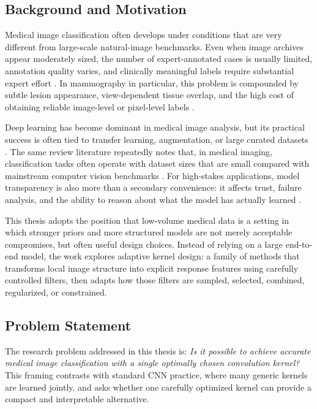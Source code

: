 \documentclass{cernatsnote}
\let\oldsubsection\subsection
\let\oldsubsubsection\subsubsection
\let\section\oldsubsection
\let\subsection\oldsubsubsection
\begin{document}
\section{Background and Motivation}
Medical image classification often develops under conditions that are very different from large-scale natural-image benchmarks. Even when image archives appear moderately sized, the number of expert-annotated cases is usually limited, annotation quality varies, and clinically meaningful labels require substantial expert effort \citep{litjens2017survey,gardezi2019mammographic,pachetti2024fewshot}. In mammography in particular, this problem is compounded by subtle lesion appearance, view-dependent tissue overlap, and the high cost of obtaining reliable image-level or pixel-level labels \citep{gardezi2019mammographic}.

Deep learning has become dominant in medical image analysis, but its practical success is often tied to transfer learning, augmentation, or large curated datasets \citep{litjens2017survey}. The same review literature repeatedly notes that, in medical imaging, classification tasks often operate with dataset sizes that are small compared with mainstream computer vision benchmarks \citep{litjens2017survey,pachetti2024fewshot}. For high-stakes applications, model transparency is also more than a secondary convenience: it affects trust, failure analysis, and the ability to reason about what the model has actually learned \citep{rudin2019blackbox,salahuddin2022transparency}.

This thesis adopts the position that low-volume medical data is a setting in which stronger priors and more structured models are not merely acceptable compromises, but often useful design choices. Instead of relying on a large end-to-end model, the work explores adaptive kernel design: a family of methods that transforms local image structure into explicit response features using carefully controlled filters, then adapts how those filters are sampled, selected, combined, regularized, or constrained.

\section{Problem Statement}
The research problem addressed in this thesis is: \emph{Is it possible to achieve accurate medical image classification with a single optimally chosen convolution kernel?}
This framing contrasts with standard CNN practice, where many generic kernels are learned jointly, and asks whether one carefully optimized kernel can provide a compact and interpretable alternative.
\end{document}
